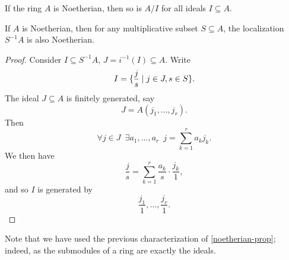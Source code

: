 \begin{lemma}
  If the ring $A$ is Noetherian, then so is $A/{I}$ for all ideals $I \subseteq A$.
\end{lemma}

\begin{lemma}
  If $A$ is Noetherian, then for any multiplicative subset $S \subseteq A$, the localization $S^{-1}A$ is also Noetherian.
\end{lemma}
\begin{proof}
  Consider $I \subseteq S^{-1}A$, $J = i^{-1}(I) \subseteq A$.
  Write
  \[ I = \{ \frac{j}{s} \mathrel{|} j \in J, s \in S \}.\]
  The ideal $J \subseteq A$ is finitely generated, say
  \[ J = A(j_1, \dotsc, j_r).\]
  Then
  \[ \forall j \in J \enspace \exists a_1, \dotsc, a_r \enspace j = \sum_{k=1}^r a_k j_k.\]
  We then have
  \[ \frac{j}{s} = \sum_{k=1}^r \frac{a_k}{s} \cdot \frac{j_k}{1},\]
  and so $I$ is generated by
  \[ \frac{j_1}{1}, \dotsc, \frac{j_r}{1}.\]
\end{proof}

Note that we have used the previous characterization of \cref{noetherian-prop}; indeed, as the submodules of a ring are exactly the ideals.

